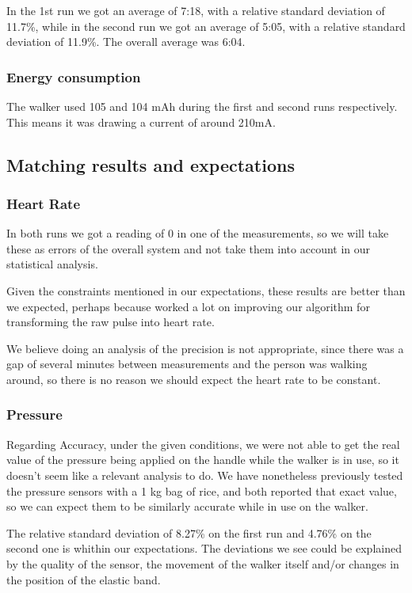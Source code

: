 			In the 1st run we got an average of 7:18, with a relative standard deviation of 11.7\%, while in the second run we got an average of 5:05, with a relative standard deviation of 11.9\%. The overall average was 6:04.

		\subsubsection{Energy consumption}
			The walker used 105 and 104 mAh during the first and second runs respectively. This means it was drawing a current of around 210mA.

	\subsection*{Matching results and expectations}
		\subsubsection{Heart Rate}
			In both runs we got a reading of $0$ in one of the measurements, so we will take these as errors of the overall system and not take them into account in our statistical analysis.

			Given the constraints mentioned in our expectations, these results are better than we expected, perhaps because worked a lot on improving our algorithm for transforming the raw pulse into heart rate.

			We believe doing an analysis of the precision is not appropriate, since there was a gap of several minutes between measurements and the person was walking around, so there is no reason we should expect the heart rate to be constant.

		\subsubsection{Pressure}
			Regarding Accuracy, under the given conditions, we were not able to get the real value of the pressure being applied on the handle while the walker is in use, so it doesn't seem like a relevant analysis to do. We have nonetheless previously tested the pressure sensors with a 1 kg bag of rice, and both reported that exact value, so we can expect them to be similarly accurate while in use on the walker.

			The relative standard deviation of 8.27\% on the first run and 4.76\% on the second one is whithin our expectations. The deviations we see could be explained by the quality of the sensor, the movement of the walker itself and/or changes in the position of the elastic band.

